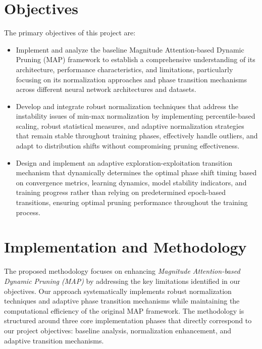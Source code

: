 \documentclass[12pt,a4paper]{report}
\begin{document}
\chapter{Objectives}
The primary objectives of this project are:
\begin{itemize}
    \item Implement and analyze the baseline Magnitude Attention-based Dynamic Pruning (MAP) framework to establish a comprehensive understanding of its architecture, performance characteristics, and limitations, particularly focusing on its normalization approaches and phase transition mechanisms across different neural network architectures and datasets.
    \item Develop and integrate robust normalization techniques that address the instability issues of min-max normalization by implementing percentile-based scaling, robust statistical measures, and adaptive normalization strategies that remain stable throughout training phases, effectively handle outliers, and adapt to distribution shifts without compromising pruning effectiveness.
    \item Design and implement an adaptive exploration-exploitation transition mechanism that dynamically determines the optimal phase shift timing based on convergence metrics, learning dynamics, model stability indicators, and training progress rather than relying on predetermined epoch-based transitions, ensuring optimal pruning performance throughout the training process.
\end{itemize}

\clearpage

\chapter{Implementation and Methodology}

The proposed methodology focuses on enhancing \textit{Magnitude Attention-based Dynamic Pruning (MAP)} by addressing the key limitations identified in our objectives. Our approach systematically implements robust normalization techniques and adaptive phase transition mechanisms while maintaining the computational efficiency of the original MAP framework. The methodology is structured around three core implementation phases that directly correspond to our project objectives: baseline analysis, normalization enhancement, and adaptive transition mechanisms.
\end{document}
